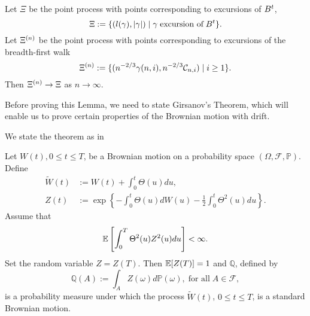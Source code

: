 \begin{lemma} \label{L: Lemma 8}
	Let $\Xi$ be the point process with points corresponding to excursions of $B^t$,
	\begin{equation} \label{E: Lemma 8 def Xi}
	\Xi := \{ (l(\gamma), |\gamma|) \; | \; \gamma \; \text{excursion of} \; B^t \}.
	\end{equation}
	Let $\Xi^{(n)}$ be the point process with points corresponding to excursions of the breadth-first walk
	\begin{equation} \label{E: Lemma 8 def Xin}
	\Xi^{(n)} := \{ ( n^{-2 / 3} \gamma(n,i), n^{-2 / 3} \mathcal{C}_{n,i} ) \; | \; i \geq 1 \}.
	\end{equation}
	Then $\Xi^{(n)} \rightarrow \Xi$ as $n \rightarrow \infty$.
\end{lemma}

Before proving this Lemma, we need to state Girsanov's Theorem, 
which will enable us to prove certain properties of the Brownian motion with drift.


We state the theorem as in \cite[Theorem 5.2.3]{Shreve2004}
\begin{theorem}[Girsanov] \label{T: Girsanov}
	Let $W(t), 0 \leq t \leq T$, be a Brownian motion on a probability space
	$(\Omega, \mathcal{F}, \mathbb{P})$.
	Define
	\begin{align}
	\tilde{W}(t) &:= W(t) + \int_0^t \Theta(u)du, \label{E: Girsanov def W tilde} \\ 
	Z(t) &:= \exp \left\{ -\int_{0}^{t} \Theta(u) dW(u) - \frac{1}{2} \int_0^t \Theta^2(u)du \right\}. \label{E: Girsanov def Z}
	\end{align}
	Assume that
	\begin{equation} \label{E: Girsanov cond Theta}
	\mathbb{E} \left[  \int_{0}^{T} \Theta^2(u) Z^2(u)du   \right] < \infty.
	\end{equation}
	Set the random variable $Z=Z(T)$. Then $\mathbb{E}[Z(T)] = 1$ and $\mathbb{Q}$, defined by
	\begin{equation} \label{E: Girsanov def Q}
	\mathbb{Q}(A) := \int_A Z(\omega) d\mathbb{P}(\omega), \; \text{for all} \; A \in \mathcal{F},
	\end{equation}
	is a probability measure under which the process 
	$\tilde{W}(t)$, $0 \leq t \leq T$, 
	is a standard Brownian motion.
\end{theorem}

